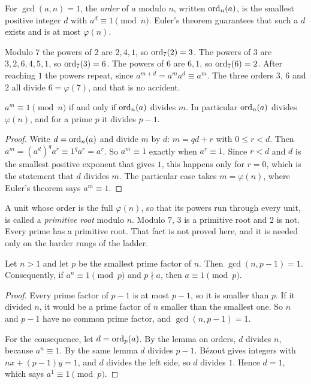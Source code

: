 \begin{definition}[Order]
For $\gcd(a, n) = 1$, the \emph{order} of $a$ modulo $n$, written $\operatorname{ord}_n(a)$, is the smallest positive integer $d$ with $a^d \equiv 1 \pmod n$. Euler's theorem guarantees that such a $d$ exists and is at most $\varphi(n)$.
\end{definition}

Modulo $7$ the powers of $2$ are $2, 4, 1$, so $\operatorname{ord}_7(2) = 3$. The powers of $3$ are $3, 2, 6, 4, 5, 1$, so $\operatorname{ord}_7(3) = 6$. The powers of $6$ are $6, 1$, so $\operatorname{ord}_7(6) = 2$. After reaching $1$ the powers repeat, since $a^{m + d} = a^m a^d \equiv a^m$. The three orders $3$, $6$ and $2$ all divide $6 = \varphi(7)$, and that is no accident.

\begin{lemma}[Orders]
$a^m \equiv 1 \pmod n$ if and only if $\operatorname{ord}_n(a)$ divides $m$. In particular $\operatorname{ord}_n(a)$ divides $\varphi(n)$, and for a prime $p$ it divides $p - 1$.
\end{lemma}

\begin{proof}
Write $d = \operatorname{ord}_n(a)$ and divide $m$ by $d$: $m = qd + r$ with $0 \le r < d$. Then $a^m = (a^d)^q a^r \equiv 1^q a^r = a^r$. So $a^m \equiv 1$ exactly when $a^r \equiv 1$. Since $r < d$ and $d$ is the smallest positive exponent that gives $1$, this happens only for $r = 0$, which is the statement that $d$ divides $m$. The particular case takes $m = \varphi(n)$, where Euler's theorem says $a^m \equiv 1$.
\end{proof}

A unit whose order is the full $\varphi(n)$, so that its powers run through every unit, is called a \emph{primitive root} modulo $n$. Modulo $7$, $3$ is a primitive root and $2$ is not. Every prime has a primitive root. That fact is not proved here, and it is needed only on the harder rungs of the ladder.

\begin{lemma}
Let $n > 1$ and let $p$ be the smallest prime factor of $n$. Then $\gcd(n, p - 1) = 1$. Consequently, if $a^n \equiv 1 \pmod p$ and $p \nmid a$, then $a \equiv 1 \pmod p$.
\end{lemma}

\begin{proof}
Every prime factor of $p - 1$ is at most $p - 1$, so it is smaller than $p$. If it divided $n$, it would be a prime factor of $n$ smaller than the smallest one. So $n$ and $p - 1$ have no common prime factor, and $\gcd(n, p - 1) = 1$.

For the consequence, let $d = \operatorname{ord}_p(a)$. By the lemma on orders, $d$ divides $n$, because $a^n \equiv 1$. By the same lemma $d$ divides $p - 1$. B\'ezout gives integers with $nx + (p - 1)y = 1$, and $d$ divides the left side, so $d$ divides $1$. Hence $d = 1$, which says $a^1 \equiv 1 \pmod p$.
\end{proof}

